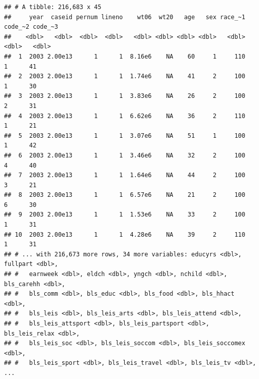 \documentclass[
]{article}
\begin{document}
\begin{verbatim}
## # A tibble: 216,683 x 45
##     year  caseid pernum lineno    wt06  wt20   age   sex race_~1 code_~2 code_~3
##    <dbl>   <dbl>  <dbl>  <dbl>   <dbl> <dbl> <dbl> <dbl>   <dbl>   <dbl>   <dbl>
##  1  2003 2.00e13      1      1  8.16e6    NA    60     1     110       1      41
##  2  2003 2.00e13      1      1  1.74e6    NA    41     2     100       1      30
##  3  2003 2.00e13      1      1  3.83e6    NA    26     2     100       2      31
##  4  2003 2.00e13      1      1  6.62e6    NA    36     2     110       1      21
##  5  2003 2.00e13      1      1  3.07e6    NA    51     1     100       1      42
##  6  2003 2.00e13      1      1  3.46e6    NA    32     2     100       4      40
##  7  2003 2.00e13      1      1  1.64e6    NA    44     2     100       3      21
##  8  2003 2.00e13      1      1  6.57e6    NA    21     2     100       6      30
##  9  2003 2.00e13      1      1  1.53e6    NA    33     2     100       1      31
## 10  2003 2.00e13      1      1  4.28e6    NA    39     2     110       1      31
## # ... with 216,673 more rows, 34 more variables: educyrs <dbl>, fullpart <dbl>,
## #   earnweek <dbl>, eldch <dbl>, yngch <dbl>, nchild <dbl>, bls_carehh <dbl>,
## #   bls_comm <dbl>, bls_educ <dbl>, bls_food <dbl>, bls_hhact <dbl>,
## #   bls_leis <dbl>, bls_leis_arts <dbl>, bls_leis_attend <dbl>,
## #   bls_leis_attsport <dbl>, bls_leis_partsport <dbl>, bls_leis_relax <dbl>,
## #   bls_leis_soc <dbl>, bls_leis_soccom <dbl>, bls_leis_soccomex <dbl>,
## #   bls_leis_sport <dbl>, bls_leis_travel <dbl>, bls_leis_tv <dbl>, ...
\end{verbatim}
\end{document}
